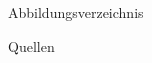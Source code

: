 \begin{frame}{Abbildungsverzeichnis}
    \listoffigures
\end{frame}

\begin{frame}{Quellen}
    \printbibliography
\end{frame}